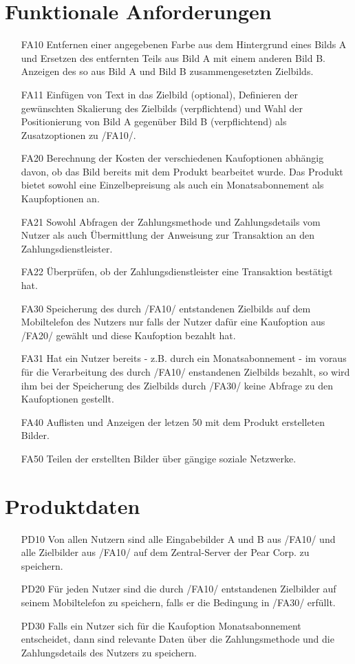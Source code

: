 \documentclass[parskip=full]{scrartcl}
\begin{document}
\section{Funktionale Anforderungen}
\begin{itemize}[nosep]
\item[FA10] Entfernen einer angegebenen Farbe aus dem Hintergrund eines Bilds A und Ersetzen des entfernten Teils aus Bild A mit einem anderen Bild B. Anzeigen des so aus Bild A und Bild B zusammengesetzten \gls{Zielbild}s.
\item[FA11] Einfügen von Text in das Zielbild (optional), Definieren der gewünschten Skalierung des Zielbilds (verpflichtend) und Wahl der Positionierung von Bild A gegenüber Bild B (verpflichtend) als Zusatzoptionen zu /FA10/.
\item[FA20] Berechnung der Kosten der verschiedenen Kaufoptionen abhängig davon, ob das Bild bereits mit dem Produkt bearbeitet wurde. Das Produkt bietet sowohl eine \gls{Einzelbepreisung} als auch ein \gls{Monatsabonnement} als Kaupfoptionen an.
\item[FA21] Sowohl Abfragen der \gls{Zahlungsmethode} und \gls{Zahlungsdetails} vom Nutzer als auch Übermittlung der Anweisung zur Transaktion an den \gls{Zahlungsdienstleister}.
\item[FA22] Überprüfen, ob der Zahlungsdienstleister eine Transaktion bestätigt hat.
\item[FA30] Speicherung des durch /FA10/ entstandenen Zielbilds auf dem Mobiltelefon des Nutzers nur falls der Nutzer dafür eine Kaufoption aus /FA20/ gewählt und diese Kaufoption bezahlt hat.
\item[FA31] Hat ein Nutzer bereits - z.B. durch ein Monatsabonnement - im voraus für die Verarbeitung des durch /FA10/ enstandenen Zielbilds bezahlt, so wird ihm bei der Speicherung des Zielbilds durch /FA30/ keine Abfrage zu den Kaufoptionen gestellt.
\item[FA40] Auflisten und Anzeigen der letzen 50 mit dem Produkt erstelleten Bilder.
\item[FA50] Teilen der erstellten Bilder über gängige soziale Netzwerke.

\end{itemize}

\section{Produktdaten}
\begin{itemize}[nosep]
\item[PD10] Von allen Nutzern sind alle Eingabebilder A und B aus /FA10/ und alle Zielbilder aus /FA10/ auf dem Zentral-Server der Pear Corp. zu speichern.
\item[PD20] Für jeden Nutzer sind die durch /FA10/ entstandenen Zielbilder auf seinem Mobiltelefon zu speichern, falls er die Bedingung in /FA30/ erfüllt.
\item[PD30] Falls ein Nutzer sich für die Kaufoption Monatsabonnement entscheidet, dann sind relevante Daten über die Zahlungsmethode und die Zahlungsdetails des Nutzers zu speichern.
\end{itemize}
\end{document}
